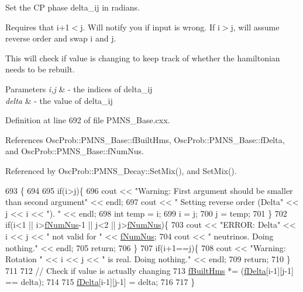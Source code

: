 Set the CP phase delta\+\_\+ij in radians.

Requires that i+1$<$j. Will notify you if input is wrong. If i$>$j, will assume reverse order and swap i and j.

This will check if value is changing to keep track of whether the hamiltonian needs to be rebuilt.


\begin{DoxyParams}{Parameters}
{\em i,j} & -\/ the indices of delta\+\_\+ij \\
\hline
{\em delta} & -\/ the value of delta\+\_\+ij \\
\hline
\end{DoxyParams}


Definition at line 692 of file P\+M\+N\+S\+\_\+\+Base.\+cxx.



References Osc\+Prob\+::\+P\+M\+N\+S\+\_\+\+Base\+::f\+Built\+Hms, Osc\+Prob\+::\+P\+M\+N\+S\+\_\+\+Base\+::f\+Delta, and Osc\+Prob\+::\+P\+M\+N\+S\+\_\+\+Base\+::f\+Num\+Nus.



Referenced by Osc\+Prob\+::\+P\+M\+N\+S\+\_\+\+Decay\+::\+Set\+Mix(), and Set\+Mix().


\begin{DoxyCode}
693 \{
694 
695   \textcolor{keywordflow}{if}(i>j)\{
696     cout << \textcolor{stringliteral}{"Warning: First argument should be smaller than second argument"} << endl;
697     cout << \textcolor{stringliteral}{"         Setting reverse order (Delta"} << j << i << \textcolor{stringliteral}{"). "} << endl;
698     \textcolor{keywordtype}{int} temp = i;
699     i = j;
700     j = temp;
701   \}
702   \textcolor{keywordflow}{if}(i<1 || i>\hyperlink{classOscProb_1_1PMNS__Base_a24bb74bed63569dfe88b18fa6a08060e}{fNumNus}-1 || j<2 || j>\hyperlink{classOscProb_1_1PMNS__Base_a24bb74bed63569dfe88b18fa6a08060e}{fNumNus})\{
703     cout << \textcolor{stringliteral}{"ERROR: Delta"} << i << j << \textcolor{stringliteral}{" not valid for "} << \hyperlink{classOscProb_1_1PMNS__Base_a24bb74bed63569dfe88b18fa6a08060e}{fNumNus};
704     cout << \textcolor{stringliteral}{" neutrinos. Doing nothing."} << endl;
705     \textcolor{keywordflow}{return};
706   \}
707   \textcolor{keywordflow}{if}(i+1==j)\{
708     cout << \textcolor{stringliteral}{"Warning: Rotation "} << i << j << \textcolor{stringliteral}{" is real. Doing nothing."} << endl;
709     \textcolor{keywordflow}{return};
710   \}
711 
712   \textcolor{comment}{// Check if value is actually changing}
713   \hyperlink{classOscProb_1_1PMNS__Base_a9ac3cadeac8db1b90f3152f476244780}{fBuiltHms} *= (\hyperlink{classOscProb_1_1PMNS__Base_ab2a5fa40e689b221c8a7d2c17213810d}{fDelta}[i-1][j-1] == delta);
714 
715   \hyperlink{classOscProb_1_1PMNS__Base_ab2a5fa40e689b221c8a7d2c17213810d}{fDelta}[i-1][j-1] = delta;
716 
717 \}
\end{DoxyCode}
\mbox{\label{classOscProb_1_1PMNS__Fast_a63733b246e6d2e609ce3de7a65ba5b9f}} 
